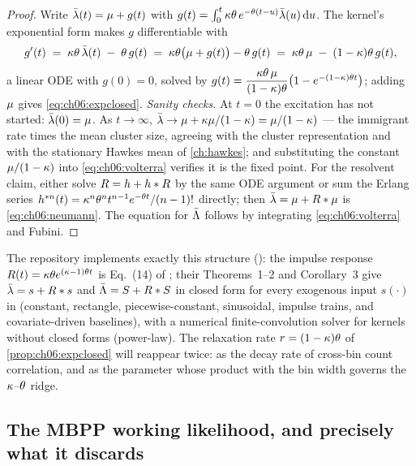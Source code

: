 \begin{proof}
Write $\bar{\lambda}(t) = \mu + g(t)$ with
$g(t) = \int_0^t \kappa\theta\, e^{-\theta(t-u)}\bar{\lambda}(u)\,\mathrm{d} u$. The
kernel's exponential form makes $g$ differentiable with
\[
g'(t) \;=\; \kappa\theta\,\bar{\lambda}(t) \;-\; \theta\, g(t)
 \;=\; \kappa\theta\big(\mu + g(t)\big) - \theta\, g(t)
 \;=\; \kappa\theta\,\mu \;-\; (1-\kappa)\theta\, g(t),
\]
a linear ODE with $g(0)=0$, solved by
$g(t) = \dfrac{\kappa\theta\,\mu}{(1-\kappa)\theta}
\big(1 - e^{-(1-\kappa)\theta t}\big)$; adding $\mu$ gives
\cref{eq:ch06:expclosed}. \emph{Sanity checks.} At $t=0$ the excitation has
not started: $\bar{\lambda}(0)=\mu$. As $t\to\infty$,
$\bar{\lambda} \to \mu + \kappa\mu/(1-\kappa) = \mu/(1-\kappa)$ --- the
immigrant rate times the mean cluster size, agreeing with the cluster
representation and with the stationary Hawkes mean of \cref{ch:hawkes};
and substituting the constant $\mu/(1-\kappa)$ into
\cref{eq:ch06:volterra} verifies it is the fixed point. For the resolvent
claim, either solve $R = h + h * R$ by the same ODE argument or
sum the Erlang series
$h^{*n}(t) = \kappa^n \theta^n t^{n-1}e^{-\theta t}/(n-1)!$
directly; then $\bar{\lambda} = \mu + R*\mu$ is
\cref{eq:ch06:neumann}. The equation for $\bar{\Lambda}$ follows by integrating
\cref{eq:ch06:volterra} and Fubini.
\end{proof}

The repository implements exactly this structure
(): the impulse response
$R(t) = \kappa\theta e^{(\kappa-1)\theta t}$ is Eq.~(14) of
\citet{rizoiu2022}; their Theorems~1--2 and Corollary~3 give
$\bar{\lambda} = s + R * s$ and $\bar{\Lambda} = S + R * S$ in closed form for every
exogenous input $s(\cdot)$ in  (constant,
rectangle, piecewise-constant, sinusoidal, impulse trains, and
covariate-driven baselines), with a numerical finite-convolution solver for
kernels without closed forms (power-law). The relaxation rate
$r = (1-\kappa)\theta$ of \cref{prop:ch06:expclosed} will reappear twice:
as the decay rate of cross-bin count correlation, and as the parameter
whose product with the bin width governs the $\kappa$--$\theta$ ridge.

\subsection{The MBPP working likelihood, and precisely what it discards}\label{ch06:sec:mbpplik}

